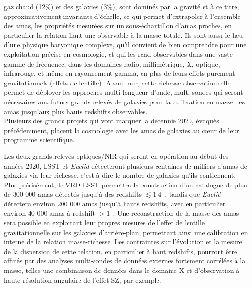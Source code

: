 gaz chaud (12$\%$) et des galaxies (3$\%$), sont dominés par la
gravité et à ce titre, approximativement invariants d'échelle, ce qui
permet d'extrapoler à l'ensemble des amas, les propriétés mesurées sur
un sous-échantillon d'amas proches, en particulier la relation liant
une observable à la masse totale. Ils sont aussi le lieu d’une
physique baryonique complexe, qu’il convient de bien comprendre pour
une exploitation précise en cosmologie, et qui les rend
observables dans une vaste gamme de fréquence, dans les domaines
radio, millimétrique, X, optique, infrarouge, et même en rayonnement
gamma, en plus de leurs effets purement gravitationnels (effets de
lentille). A son tour, cette richesse observationnelle permet de
déployer les approches multi-longueur d’onde, multi-sondes
qui seront nécessaires aux futurs grands relevés de galaxies pour la
calibration en masse des amas jusqu'aux plus hauts redshifts
observables.\\


Plusieurs des grands projets qui vont marquer la décennie 2020, évoqués
précédemment, placent la cosmologie avec les amas de galaxies au cœur
de leur programme scientifique.

Les deux grands relevés optiques/NIR qui seront en opération au début
des années 2020, LSST et \emph{Euclid} détecteront plusieurs centaines
de milliers d'amas de galaxies via leur richesse,
c'est-à-dire le nombre de galaxies qu'ils contiennent. Plus
précisément, le VRO-LSST permettra la construction d'un catalogue de plus de 300 000 amas
détectés jusqu'à des redshifts $\lesssim 1.4$~\citep{LSST2019}, tandis
que \emph{Euclid} détectera environ 200 000 amas jusqu'à hauts
redshifts, avec en particulier environ 40 000 amas à redshift
$>1$~\citep{Sartoris2016, Adam2019_euclid}. Une reconstruction de la
masse des amas sera possible en exploitant leur propres mesures de l'effet de
lentille gravitationnelle sur les galaxies d'arrière-plan, permettant
ainsi une calibration en interne de la relation
masse-richesse. Les contraintes sur l'évolution et la mesure de la
dispersion de cette relation, en particulier à haut redshifts,
pourront être affinés par des analyses multi-sondes de données
externes fortement corrélées à la masse, telles une combinaison de
données dans le domaine X et d'observation à haute résolution
angulaire de l'effet SZ, par exemple.

